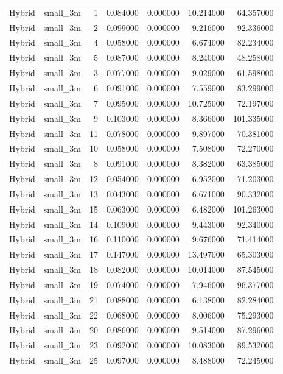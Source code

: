 \begin{tabular}{llrrrrr}
Hybrid & small_3m & 1 & 0.084000 & 0.000000 & 10.214000 & 64.357000 \\
Hybrid & small_3m & 2 & 0.099000 & 0.000000 & 9.216000 & 92.336000 \\
Hybrid & small_3m & 4 & 0.058000 & 0.000000 & 6.674000 & 82.234000 \\
Hybrid & small_3m & 5 & 0.087000 & 0.000000 & 8.240000 & 48.258000 \\
Hybrid & small_3m & 3 & 0.077000 & 0.000000 & 9.029000 & 61.598000 \\
Hybrid & small_3m & 6 & 0.091000 & 0.000000 & 7.559000 & 83.299000 \\
Hybrid & small_3m & 7 & 0.095000 & 0.000000 & 10.725000 & 72.197000 \\
Hybrid & small_3m & 9 & 0.103000 & 0.000000 & 8.366000 & 101.335000 \\
Hybrid & small_3m & 11 & 0.078000 & 0.000000 & 9.897000 & 70.381000 \\
Hybrid & small_3m & 10 & 0.058000 & 0.000000 & 7.508000 & 72.270000 \\
Hybrid & small_3m & 8 & 0.091000 & 0.000000 & 8.382000 & 63.385000 \\
Hybrid & small_3m & 12 & 0.054000 & 0.000000 & 6.952000 & 71.203000 \\
Hybrid & small_3m & 13 & 0.043000 & 0.000000 & 6.671000 & 90.332000 \\
Hybrid & small_3m & 15 & 0.063000 & 0.000000 & 6.482000 & 101.263000 \\
Hybrid & small_3m & 14 & 0.109000 & 0.000000 & 9.443000 & 92.340000 \\
Hybrid & small_3m & 16 & 0.110000 & 0.000000 & 9.676000 & 71.414000 \\
Hybrid & small_3m & 17 & 0.147000 & 0.000000 & 13.497000 & 65.303000 \\
Hybrid & small_3m & 18 & 0.082000 & 0.000000 & 10.014000 & 87.545000 \\
Hybrid & small_3m & 19 & 0.074000 & 0.000000 & 7.946000 & 96.377000 \\
Hybrid & small_3m & 21 & 0.088000 & 0.000000 & 6.138000 & 82.284000 \\
Hybrid & small_3m & 22 & 0.068000 & 0.000000 & 8.006000 & 75.293000 \\
Hybrid & small_3m & 20 & 0.086000 & 0.000000 & 9.514000 & 87.296000 \\
Hybrid & small_3m & 23 & 0.092000 & 0.000000 & 10.083000 & 89.532000 \\
Hybrid & small_3m & 25 & 0.097000 & 0.000000 & 8.488000 & 72.245000 \\

\end{tabular}
